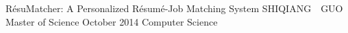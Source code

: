 \maketitlepage
{R\'esuMatcher: A Personalized R\'esum\'e-Job Matching System
}   %
{SHIQIANG~~GUO}%
{Master of Science}                %
{October 2014}%
{Computer Science}         %
